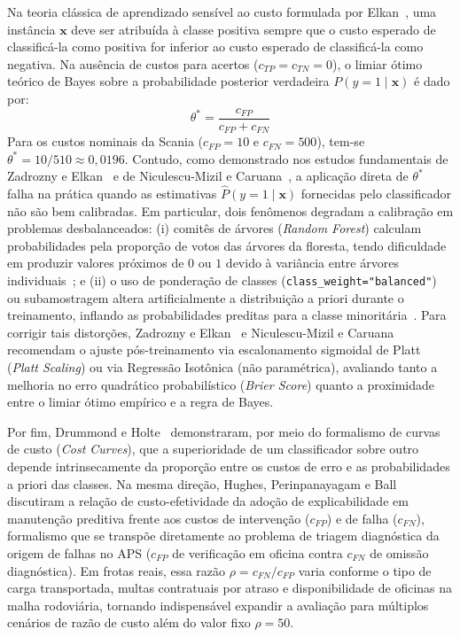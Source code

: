 \documentclass[conference]{IEEEtran}
\begin{document}
Na teoria clássica de aprendizado sensível ao custo formulada por Elkan~\cite{elkan2001foundations}, uma instância $\mathbf{x}$ deve ser atribuída à classe positiva sempre que o custo esperado de classificá-la como positiva for inferior ao custo esperado de classificá-la como negativa. Na ausência de custos para acertos ($c_{TP} = c_{TN} = 0$), o limiar ótimo teórico de Bayes sobre a probabilidade posterior verdadeira $P(y=1 \mid \mathbf{x})$ é dado por:
\begin{equation}
    \theta^* = \frac{c_{FP}}{c_{FP} + c_{FN}}
    \label{eq:limiar_bayes}
\end{equation}
Para os custos nominais da Scania ($c_{FP} = 10$ e $c_{FN} = 500$), tem-se $\theta^* = 10/510 \approx 0{,}0196$. Contudo, como demonstrado nos estudos fundamentais de Zadrozny e Elkan~\cite{zadrozny2002transforming} e de Niculescu-Mizil e Caruana~\cite{niculescu2005predicting}, a aplicação direta de $\theta^*$ falha na prática quando as estimativas $\hat{P}(y=1 \mid \mathbf{x})$ fornecidas pelo classificador não são bem calibradas. Em particular, dois fenômenos degradam a calibração em problemas desbalanceados: (i) comitês de árvores (\textit{Random Forest}) calculam probabilidades pela proporção de votos das árvores da floresta, tendo dificuldade em produzir valores próximos de $0$ ou $1$ devido à variância entre árvores individuais~\cite{niculescu2005predicting}; e (ii) o uso de ponderação de classes (\texttt{class\_weight="balanced"}) ou subamostragem altera artificialmente a distribuição a priori durante o treinamento, inflando as probabilidades preditas para a classe minoritária~\cite{dalpozzolo2015calibrating}. Para corrigir tais distorções, Zadrozny e Elkan~\cite{zadrozny2002transforming} e Niculescu-Mizil e Caruana~\cite{niculescu2005predicting} recomendam o ajuste pós-treinamento via escalonamento sigmoidal de Platt (\textit{Platt Scaling}) ou via Regressão Isotônica (não paramétrica), avaliando tanto a melhoria no erro quadrático probabilístico (\textit{Brier Score}) quanto a proximidade entre o limiar ótimo empírico e a regra de Bayes.

Por fim, Drummond e Holte~\cite{drummond2006cost} demonstraram, por meio do formalismo de curvas de custo (\textit{Cost Curves}), que a superioridade de um classificador sobre outro depende intrinsecamente da proporção entre os custos de erro e as probabilidades a priori das classes. Na mesma direção, Hughes, Perinpanayagam e Ball~\cite{hughes2025xai} discutiram a relação de custo-efetividade da adoção de explicabilidade em manutenção preditiva frente aos custos de intervenção ($c_{FP}$) e de falha ($c_{FN}$), formalismo que se transpõe diretamente ao problema de triagem diagnóstica da origem de falhas no APS ($c_{FP}$ de verificação em oficina contra $c_{FN}$ de omissão diagnóstica). Em frotas reais, essa razão $\rho = c_{FN}/c_{FP}$ varia conforme o tipo de carga transportada, multas contratuais por atraso e disponibilidade de oficinas na malha rodoviária, tornando indispensável expandir a avaliação para múltiplos cenários de razão de custo além do valor fixo $\rho = 50$.
\end{document}
